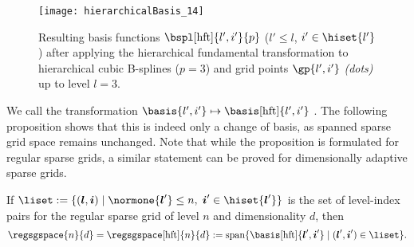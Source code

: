 \begin{SCfigure}
  \texttt{[image: hierarchicalBasis\_14]}%
  \caption[%
    Hierarchical B-splines transformed via the hierarchical fundamental
    transformation%
  ]{%
    Resulting basis functions $\bspl[\hft]{l',i'}{p}$
    ($l' \le l$, $i' \in \hiset{l'}$)
    after applying the hierarchical fundamental transformation
    to hierarchical cubic B-splines ($p = 3$) and
    grid points $\gp{l',i'}$ \emph{(dots)} up to level $l = 3$.%
  }%
  \label{fig:hftBSpline}%
\end{SCfigure}

We call the transformation $\basis{l',i'} \mapsto \basis[\hft]{l',i'}$
\term{\hftr}.
The following proposition shows that this is indeed only a change of basis,
as spanned sparse grid space remains unchanged.
Note that while the proposition is formulated for regular sparse grids,
a similar statement can be proved for dimensionally adaptive sparse grids.

\begin{proposition}
  \label{prop:hftSparseGridSpace}
  If $\liset := \{(\*l, \*i) \mid
  \normone{\*l'} \le n,\; \*i' \in \hiset{\*l'}\}$
  is the set of level-index pairs for the regular sparse grid of level $n$
  and dimensionality $d$, then
  \begin{equation}
    \regsgspace{n}{d}
    = \regsgspace[\hft]{n}{d}
    := \spn\{\basis[\hft]{\*l',\*i'} \mid (\*l', \*i') \in \liset\}.
  \end{equation}
\end{proposition}

